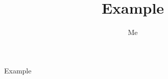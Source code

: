 \documentclass{article}
\begin{document}
    \title{Example}
    \author{Me}
    \maketitle
    Example \cite{test2017}
    
    
\end{document}
